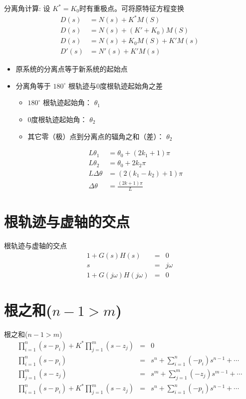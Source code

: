 \begin{frame}{分离角计算:}
设 $K^*=K_0$时有重极点。可将原特征方程变换
\begin{align*}
D(s)&=N(s)+K^*M(S)\\
D(s)&=N(s)+(K'+K_0)M(S)\\
D(s)&=N(s)+K_0M(S)+K'M(s)\\
D'(s)&=N'(s)+K'M(s)
\end{align*}
\begin{itemize}
\item 原系统的分离点等于新系统的起始点
\item 分离角等于 $180^\circ$ 根轨迹与0度根轨迹起始角之差
\begin{itemize}
\item $180^\circ$ 根轨迹起始角： $\theta_1$
\item 0度根轨迹起始角： $\theta_2$
\item 其它零（极）点到分离点的辐角之和（差）： $\theta_2$
\end{itemize}
\begin{align*}
L\theta_1  &= \theta_0+(2k_1+1)\pi\\
L\theta_2 &= \theta_0+2k_2\pi\\
L\Delta\theta &=(2(k_1-k_2)+1)\pi\\
\Delta\theta &=\frac{(2k+1)\pi}{L}
\end{align*}
\end{itemize}

\end{frame}

\section{根轨迹与虚轴的交点}
\begin{frame}{根轨迹与虚轴的交点}
\begin{eqnarray*}
1+G(s)H(s) & = & 0\\
s & = & j\omega\\
1+G(j\omega)H(j\omega) & = & 0
\end{eqnarray*}

\end{frame}

\section{根之和($n-1>m$)}
\begin{frame}{根之和($n-1>m$)}
\begin{eqnarray*}
\prod_{i=1}^{n}(s-p_{i})+K^{*}\prod_{j=1}^{m}(s-z_{j}) & = & 0\\
\prod_{i=1}^{n}(s-p_{i}) & = & s^{n}+\sum_{i=1}^{n}(-p_{i})s^{n-1}+\cdots\\
\prod_{j=1}^{m}(s-z_{j}) & = & s^{m}+\sum_{j=1}^{m}(-z_{j})s^{m-1}+\cdots\\
\prod_{i=1}^{n}(s-p_{i})+K^{*}\prod_{j=1}^{m}(s-z_{j}) & = & s^{n}+\sum_{i=1}^{n}(-p_{i})s^{n-1}+\cdots
\end{eqnarray*}

\end{frame}

